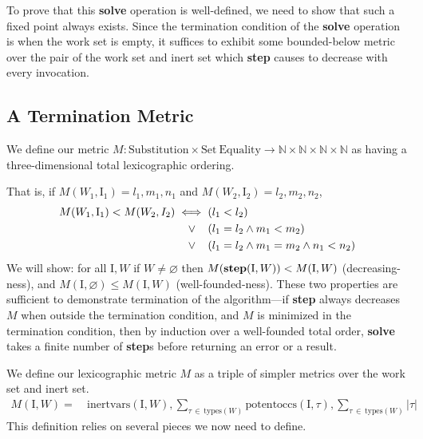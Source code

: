 \documentclass[10pt, letterpaper, oneside]{article}
\newcommand{\inertset}{\text{I}}
\begin{document}
To prove that this \textbf{solve} operation is well-defined, we need to show that such a fixed point always exists. Since the termination condition of the \textbf{solve} operation is when the work set is empty, it suffices to exhibit some bounded-below metric over the pair of the work set and inert set which \textbf{step} causes to decrease with every invocation.

\subsection{A Termination Metric}

We define our metric \(M : \text{Substitution} \times \text{Set}~\text{Equality} \to \mathbb{N} \times \mathbb{N} \times \mathbb{N} \times \mathbb{N}\) as having a three-dimensional total lexicographic ordering.

That is, if \(M(W_1, \inertset_1) = l_1, m_1, n_1\) and \(M(W_2, \inertset_2) = l_2, m_2, n_2\),
\begin{alignat*}{1}
  M(W_1, \inertset_1) < M(W_2, I_2) \iff (&l_1 < l_2)\\
                      \lor\hspace{1.1em}(&l_1 = l_2 \land m_1 < m_2)\\
                      \lor\hspace{1.1em}(&l_1 = l_2 \land m_1 = m_2 \land n_1 < n_2)
\end{alignat*}
We will show: for all \(\inertset, W\) if \(W \ne \varnothing\) then \(M(\text{\bf step}(\inertset, W)) < M(\inertset, W)\) (decreasing-ness), and \(M(\inertset, \varnothing) \le M(\inertset, W)\) (well-founded-ness). These two properties are sufficient to demonstrate termination of the algorithm---if \textbf{step} always decreases \(M\) when outside the termination condition, and \(M\) is minimized in the termination condition, then by induction over a well-founded total order, \textbf{solve} takes a finite number of \textbf{step}s before returning an error or a result.

We define our lexicographic metric \(M\) as a triple of simpler metrics over the work set and inert set.
\begin{align*}
  M(\inertset, W) = &~\text{inertvars}(\inertset, W), \!\!\!\!\!\sum_{\tau\,\in\,\text{types}(W)}\!\!\!\!\!\!\!\!\text{potentoccs}(\inertset, \tau), \!\!\!\!\!\sum_{\tau\,\in\,\text{types}(W)}\!\!\!\!\!\!\!\!|\tau|
\end{align*}
This definition relies on several pieces we now need to define.
\end{document}
